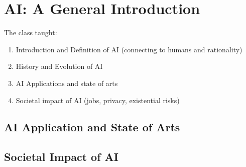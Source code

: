 \chapter{AI: A General Introduction}
\label{chap:label}

\begin{note}[Objectives]
  The class taught:\\
  \begin{enumerate}
    \item Introduction and Definition of AI (connecting to humans and
      rationality)
    \item History and Evolution of AI
    \item AI Applications and state of arts
    \item Societal impact of AI (jobs, privacy, existential risks)
  \end{enumerate}
\end{note}



\section{AI Application and State of Arts}
\label{sec:application-ai}

\section{Societal Impact of AI}
\label{sec:social-impact-ai}


